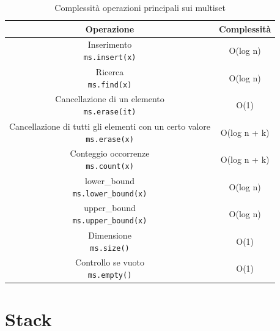 \begin{table}[h!]
	\centering
	\renewcommand{\arraystretch}{1.5}
	\setlength{\tabcolsep}{12pt}
	\begin{tabular}{|c|c|}
		\hline
		\textbf{Operazione} & \textbf{Complessità} \\
		\hline
		\makecell{Inserimento \\ \texttt{ms.insert(x)}} & O(log n) \\
		\hline
		\makecell{Ricerca \\ \texttt{ms.find(x)}} & O(log n) \\
		\hline
		\makecell{Cancellazione di un elemento \\ \texttt{ms.erase(it)}} & O(1) \\
		\hline
		\makecell{Cancellazione di tutti gli elementi con un certo valore \\ \texttt{ms.erase(x)}} & O(log n + k)\footnotemark \\ 
		\hline
		\makecell{Conteggio occorrenze \\ \texttt{ms.count(x)}} & O(log n + k) \\
		\hline
		\makecell{lower\_bound \\ \texttt{ms.lower\_bound(x)}} & O(log n) \\
		\hline
		\makecell{upper\_bound \\ \texttt{ms.upper\_bound(x)}} & O(log n) \\
		\hline
		\makecell{Dimensione \\ \texttt{ms.size()}} & O(1) \\
		\hline
		\makecell{Controllo se vuoto \\ \texttt{ms.empty()}} & O(1) \\
		\hline
	\end{tabular}
	\caption{Complessità operazioni principali sui multiset}
\end{table}






\newpage

\section{Stack}


